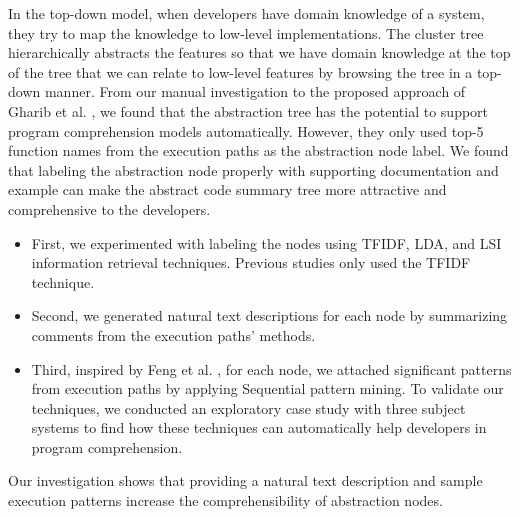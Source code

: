 In the top-down model, when developers have domain knowledge of a system, they try to map the knowledge to low-level implementations. The cluster tree hierarchically abstracts the features so that we have domain knowledge at the top of the tree that we can relate to low-level features by browsing the tree in a top-down manner. From our manual investigation to the proposed approach of Gharib et al. \cite{gharibi2018automaticStaticCluster}, we found that the abstraction tree has the potential to support program comprehension models automatically. However, they only used top-5 function names from the execution paths as the abstraction node label. We found that labeling the abstraction node properly with supporting documentation and example can make the abstract code summary tree more attractive and comprehensive to the developers. 
\begin{itemize}
    \item First, we experimented with labeling the nodes using TFIDF, LDA, and LSI information retrieval techniques. Previous studies only used the TFIDF technique.
    \item Second, we generated natural text descriptions for each node by summarizing comments from the execution paths' methods.
    \item Third, inspired by Feng et al. \cite{feng2018hierarchicalExecutionComprehension}, for each node, we attached significant patterns from execution paths by applying Sequential pattern mining. To validate our techniques, we conducted an exploratory case study with three subject systems to find how these techniques can automatically help developers in program comprehension. 
\end{itemize}

Our investigation shows that providing a natural text description and sample execution patterns increase the comprehensibility of abstraction nodes. 

 


